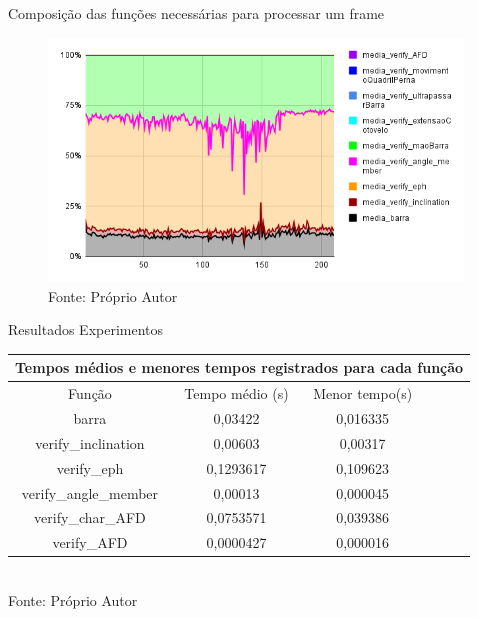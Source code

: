 \begin{frame}{Composição das funções necessárias para processar um frame}
   \begin{figure}[H]
    \includegraphics[width=11cm]{img/resultados/comp_process_cell_1.png}
    {Fonte: Próprio Autor}
    \label{figura:configs_server}
    \end{figure}
\end{frame}





\begin{frame}{Resultados Experimentos}
    \fontsize{7pt}{8pt}\selectfont
    \begin{table}[H]
    \centering
    \begin{tabular}{@{}cccccc@{}}
    \toprule
    \multicolumn{6}{c}{Tempos médios e menores tempos registrados para cada função}
    \\ \midrule
    Função & Tempo médio (s) & Menor tempo(s) \\
    \midrule
    barra & 0,03422 & 0,016335 \\
    verify\_inclination & 0,00603 & 0,00317 \\
    verify\_eph & 0,1293617 & 0,109623 \\
    verify\_angle\_member & 0,00013 & 0,000045 \\
    verify\_char\_AFD & 0,0753571 & 0,039386 \\
    verify\_AFD & 0,0000427 & 0,000016 \\
    \bottomrule
    \end{tabular}
    \label{tab:tempos_funcoes}
    \\
    {Fonte: Próprio Autor}
    \end{table}
\end{frame}






